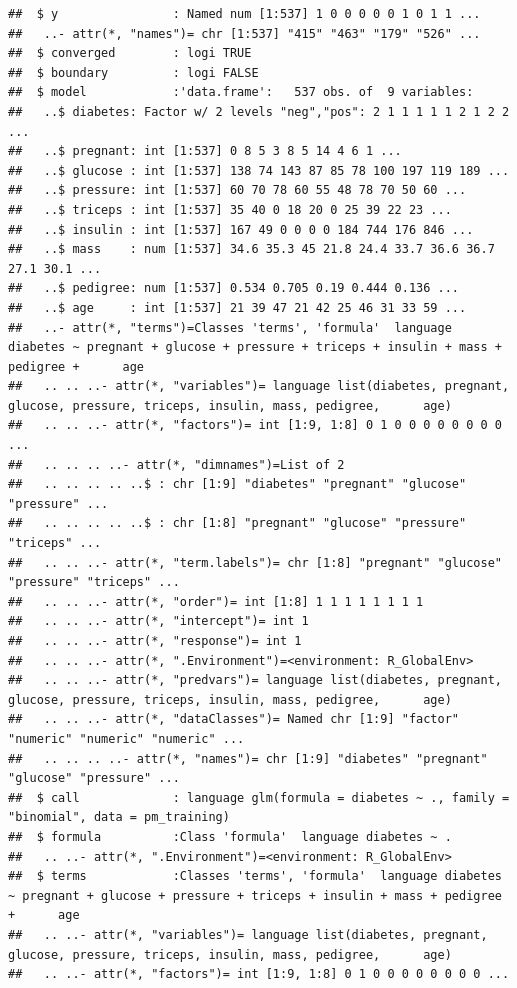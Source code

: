 \documentclass[
]{article}
\begin{document}
\begin{verbatim}
##  $ y                : Named num [1:537] 1 0 0 0 0 0 1 0 1 1 ...
##   ..- attr(*, "names")= chr [1:537] "415" "463" "179" "526" ...
##  $ converged        : logi TRUE
##  $ boundary         : logi FALSE
##  $ model            :'data.frame':   537 obs. of  9 variables:
##   ..$ diabetes: Factor w/ 2 levels "neg","pos": 2 1 1 1 1 1 2 1 2 2 ...
##   ..$ pregnant: int [1:537] 0 8 5 3 8 5 14 4 6 1 ...
##   ..$ glucose : int [1:537] 138 74 143 87 85 78 100 197 119 189 ...
##   ..$ pressure: int [1:537] 60 70 78 60 55 48 78 70 50 60 ...
##   ..$ triceps : int [1:537] 35 40 0 18 20 0 25 39 22 23 ...
##   ..$ insulin : int [1:537] 167 49 0 0 0 0 184 744 176 846 ...
##   ..$ mass    : num [1:537] 34.6 35.3 45 21.8 24.4 33.7 36.6 36.7 27.1 30.1 ...
##   ..$ pedigree: num [1:537] 0.534 0.705 0.19 0.444 0.136 ...
##   ..$ age     : int [1:537] 21 39 47 21 42 25 46 31 33 59 ...
##   ..- attr(*, "terms")=Classes 'terms', 'formula'  language diabetes ~ pregnant + glucose + pressure + triceps + insulin + mass + pedigree +      age
##   .. .. ..- attr(*, "variables")= language list(diabetes, pregnant, glucose, pressure, triceps, insulin, mass, pedigree,      age)
##   .. .. ..- attr(*, "factors")= int [1:9, 1:8] 0 1 0 0 0 0 0 0 0 0 ...
##   .. .. .. ..- attr(*, "dimnames")=List of 2
##   .. .. .. .. ..$ : chr [1:9] "diabetes" "pregnant" "glucose" "pressure" ...
##   .. .. .. .. ..$ : chr [1:8] "pregnant" "glucose" "pressure" "triceps" ...
##   .. .. ..- attr(*, "term.labels")= chr [1:8] "pregnant" "glucose" "pressure" "triceps" ...
##   .. .. ..- attr(*, "order")= int [1:8] 1 1 1 1 1 1 1 1
##   .. .. ..- attr(*, "intercept")= int 1
##   .. .. ..- attr(*, "response")= int 1
##   .. .. ..- attr(*, ".Environment")=<environment: R_GlobalEnv> 
##   .. .. ..- attr(*, "predvars")= language list(diabetes, pregnant, glucose, pressure, triceps, insulin, mass, pedigree,      age)
##   .. .. ..- attr(*, "dataClasses")= Named chr [1:9] "factor" "numeric" "numeric" "numeric" ...
##   .. .. .. ..- attr(*, "names")= chr [1:9] "diabetes" "pregnant" "glucose" "pressure" ...
##  $ call             : language glm(formula = diabetes ~ ., family = "binomial", data = pm_training)
##  $ formula          :Class 'formula'  language diabetes ~ .
##   .. ..- attr(*, ".Environment")=<environment: R_GlobalEnv> 
##  $ terms            :Classes 'terms', 'formula'  language diabetes ~ pregnant + glucose + pressure + triceps + insulin + mass + pedigree +      age
##   .. ..- attr(*, "variables")= language list(diabetes, pregnant, glucose, pressure, triceps, insulin, mass, pedigree,      age)
##   .. ..- attr(*, "factors")= int [1:9, 1:8] 0 1 0 0 0 0 0 0 0 0 ...

\end{verbatim}
\end{document}
